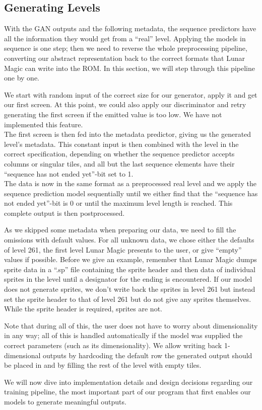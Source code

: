 \subsection{Generating Levels}
\label{sec:generating-levels}

With the GAN outputs and the following metadata, the sequence
predictors have all the information they would get from a ``real''
level. Applying the models in sequence is one step; then we need to
reverse the whole preprocessing pipeline, converting our abstract
representation back to the correct formats that Lunar Magic can write
into the ROM. In this section, we will step through this pipeline one
by one.

We start with random input of the correct size for our generator,
apply it and get our first screen. At this point, we could also apply
our discriminator and retry generating the first screen if the emitted
value is too low. We have not implemented this feature. \\
The first screen is then fed into the metadata predictor, giving us
the generated level's metadata. This constant input is then combined
with the level in the correct specification, depending on whether the
sequence predictor accepts columns or singular tiles, and all but the
last sequence elements have their ``sequence has not ended yet''-bit
set to 1. \\
The data is now in the same format as a preprocessed real level and we
apply the sequence prediction model sequentially until we either find
that the ``sequence has not ended yet''-bit is 0 or until the maximum
level length is reached. This complete output is then postprocessed.

As we skipped some metadata when preparing our data, we need to fill
the omissions with default values. For all unknown data, we chose
either the defaults of level 261, the first level Lunar Magic presents
to the user, or give ``empty'' values if possible. Before we give an
example, remember that Lunar Magic dumps sprite data in a ``.sp'' file
containing the sprite header and then data of individual sprites in
the level until a designator for the ending is encountered. If our
model does not generate sprites, we don't write back the sprites in
level 261 but instead set the sprite header to that of level 261 but
do not give any sprites themselves. While the sprite header is
required, sprites are not.

Note that during all of this, the user does not have to worry about
dimensionality in any way; all of this is handled automatically if the
model was supplied the correct parameters (such as its
dimensionality). We allow writing back 1-dimensional outputs by
hardcoding the default row the generated output should be placed in
and by filling the rest of the level with empty tiles.

We will now dive into implementation details and design decisions
regarding our training pipeline, the most important part of our
program that first enables our models to generate meaningful outputs.


